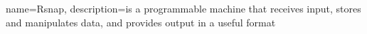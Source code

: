 {
 name=Rsnap,
 description={is a programmable machine that receives input,
              stores and manipulates data, and provides
              output in a useful format}
}
